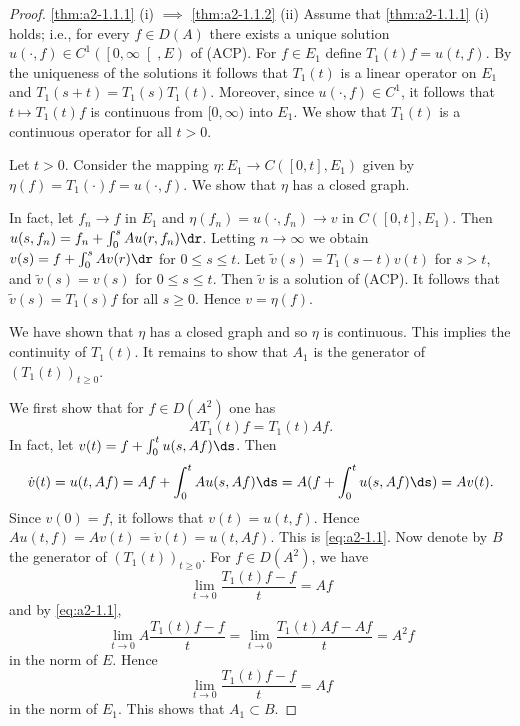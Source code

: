 \begin{proof} \ref{thm:a2-1.1.1} (\lnm i) $\implies$ \ref{thm:a2-1.1.2} (\lnm ii)
Assume that \ref{thm:a2-1.1.1} (\lnm i) %
holds; i.e., for every $f \in D(A)$ there exists a unique solution $u(\cdot,f) \in C^{1}(\left[0,\infty\right[,E)$ of (ACP).
For $f \in E_{1}$ define $T_{1}(t)f = u(t,f)$.
By the uniqueness of the solutions it follows that $T_{1}(t)$ is a linear operator on $E_{1}$ and $T_{1}(s+t) = T_{1}(s)T_{1}(t)$.
Moreover, since $u(\cdot,f) \in C^{1}$, it follows that $t \mapsto T_{1}(t)f$ is continuous from $[0,\infty)$ into $E_{1}$.
We show that $T_{1}(t)$ is a continuous operator for all $t > 0$.

Let $t > 0$.
Consider the mapping $\eta \colon E_{1} \to C([0,t],E_{1})$ given by $\eta(f) = T_{1}(\cdot)f = u(\cdot,f)$.
We show that $\eta$ has a closed graph.

In fact, let $f_{n} \to f$ in $E_{1}$ and $\eta(f_{n}) = u(\cdot,f_{n}) \to v$ in $C([0,t],E_{1})$.
Then $u(s,f_{n}) = f_{n} + \int_{0}^{s} Au(r,f_{n}) \dr$.
Letting $n \to \infty$ we obtain $v(s) = f + \int_{0}^{s} Av(r) \dr$ for $0 \leq s \leq t$.
Let $\tilde{v}(s) = T_{1}(s-t)v(t)$ for $s > t$, and $\tilde{v}(s) = v(s)$ for $0 \leq s \leq t$.
Then $\tilde{v}$ is a solution of (ACP).
It follows that $\tilde{v}(s) = T_{1}(s)f$ for all $s \geq 0$.
Hence $v = \eta (f)$.

We have shown that $\eta$ has a closed graph and so $\eta$ is continuous.
This implies the continuity of $T_{1}(t)$.
It remains to show that $A_{1}$ is the generator of $(T_{1}(t))_{t \geq 0}$.

We first show that for $f \in D(A^{2})$ one has
\begin{equation}\label{eq:a2-1.1}
AT_{1}(t)f = T_{1}(t)Af.
\end{equation}
In fact, let $v(t) = f + \int_{0}^{t} u(s,Af) \ds$.
Then 
\[
\dot{v}(t) = u(t,Af) = Af + \int_{0}^{t} Au(s,Af) \ds = A(f + \int_{0}^{t} u(s,Af) \ds) = Av(t) .
\]
Since $v(0) = f$, it follows that $v(t) = u(t,f)$.
Hence $Au(t,f) = Av(t) = \dot{v}(t) = u(t,Af)$.
This is \eqref{eq:a2-1.1}.
Now denote by $B$ the generator of $(T_{1}(t))_{t \geq 0}$.
For $f \in D(A^{2})$, we have
\[
    \lim_{t \to 0} \frac{T_{1}(t)f - f}{t} = Af
\]
and by \eqref{eq:a2-1.1},
\[
    \lim_{t \to 0} A\frac{T_{1}(t)f - f}{t} = 
    \lim_{t \to 0} \frac{T_{1}(t)Af - Af}{t} = A^{2}f
\]
in the norm of $E$.
Hence 
\[ 
\lim_{t \to 0} \frac{T_{1}(t)f - f}{t} = Af
\]
in the norm of $E_{1}$.
This shows that $A_{1} \subset B$.


\end{proof}
